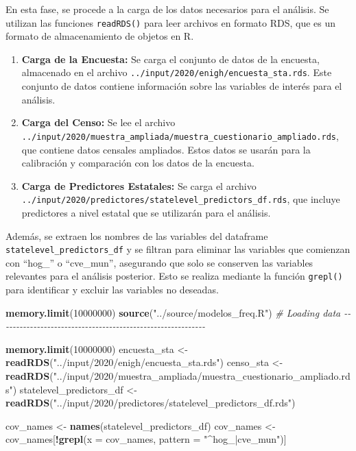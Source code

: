 \documentclass[
  12pt,
]{book}
\newenvironment{Shaded}{\begin{snugshade}}{\end{snugshade}}
\newcommand{\AttributeTok}[1]{\textcolor[rgb]{0.13,0.29,0.53}{#1}}
\newcommand{\CommentTok}[1]{\textcolor[rgb]{0.56,0.35,0.01}{\textit{#1}}}
\newcommand{\DecValTok}[1]{\textcolor[rgb]{0.00,0.00,0.81}{#1}}
\newcommand{\FunctionTok}[1]{\textcolor[rgb]{0.13,0.29,0.53}{\textbf{#1}}}
\newcommand{\NormalTok}[1]{#1}
\newcommand{\OtherTok}[1]{\textcolor[rgb]{0.56,0.35,0.01}{#1}}
\newcommand{\SpecialCharTok}[1]{\textcolor[rgb]{0.81,0.36,0.00}{\textbf{#1}}}
\newcommand{\StringTok}[1]{\textcolor[rgb]{0.31,0.60,0.02}{#1}}
\begin{document}
En esta fase, se procede a la carga de los datos necesarios para el análisis. Se utilizan las funciones \texttt{readRDS()} para leer archivos en formato RDS, que es un formato de almacenamiento de objetos en R.

\begin{enumerate}
\def\labelenumi{\arabic{enumi}.}
\item
  \textbf{Carga de la Encuesta:} Se carga el conjunto de datos de la encuesta, almacenado en el archivo \texttt{../input/2020/enigh/encuesta\_sta.rds}. Este conjunto de datos contiene información sobre las variables de interés para el análisis.
\item
  \textbf{Carga del Censo:} Se lee el archivo \texttt{../input/2020/muestra\_ampliada/muestra\_cuestionario\_ampliado.rds}, que contiene datos censales ampliados. Estos datos se usarán para la calibración y comparación con los datos de la encuesta.
\item
  \textbf{Carga de Predictores Estatales:} Se carga el archivo \texttt{../input/2020/predictores/statelevel\_predictors\_df.rds}, que incluye predictores a nivel estatal que se utilizarán para el análisis.
\end{enumerate}

Además, se extraen los nombres de las variables del dataframe \texttt{statelevel\_predictors\_df} y se filtran para eliminar las variables que comienzan con ``hog\_'' o ``cve\_mun'', asegurando que solo se conserven las variables relevantes para el análisis posterior. Esto se realiza mediante la función \texttt{grepl()} para identificar y excluir las variables no deseadas.

\begin{Shaded}
\begin{Highlighting}[]
\FunctionTok{memory.limit}\NormalTok{(}\DecValTok{10000000}\NormalTok{)}
\FunctionTok{source}\NormalTok{(}\StringTok{"../source/modelos\_freq.R"}\NormalTok{)}
\CommentTok{\# Loading data {-}{-}{-}{-}{-}{-}{-}{-}{-}{-}{-}{-}{-}{-}{-}{-}{-}{-}{-}{-}{-}{-}{-}{-}{-}{-}{-}{-}{-}{-}{-}{-}{-}{-}{-}{-}{-}{-}{-}{-}{-}{-}{-}{-}{-}{-}{-}{-}{-}{-}{-}{-}{-}{-}{-}{-}{-}{-}{-}{-}}

\FunctionTok{memory.limit}\NormalTok{(}\DecValTok{10000000}\NormalTok{)}
\NormalTok{encuesta\_sta }\OtherTok{\textless{}{-}} \FunctionTok{readRDS}\NormalTok{(}\StringTok{"../input/2020/enigh/encuesta\_sta.rds"}\NormalTok{)}
\NormalTok{censo\_sta }\OtherTok{\textless{}{-}} \FunctionTok{readRDS}\NormalTok{(}\StringTok{"../input/2020/muestra\_ampliada/muestra\_cuestionario\_ampliado.rds"}\NormalTok{)}
\NormalTok{statelevel\_predictors\_df }\OtherTok{\textless{}{-}} \FunctionTok{readRDS}\NormalTok{(}\StringTok{"../input/2020/predictores/statelevel\_predictors\_df.rds"}\NormalTok{)}

\NormalTok{cov\_names }\OtherTok{\textless{}{-}} \FunctionTok{names}\NormalTok{(statelevel\_predictors\_df)}
\NormalTok{cov\_names }\OtherTok{\textless{}{-}}\NormalTok{ cov\_names[}\SpecialCharTok{!}\FunctionTok{grepl}\NormalTok{(}\AttributeTok{x =}\NormalTok{ cov\_names, }\AttributeTok{pattern =} \StringTok{"\^{}hog\_|cve\_mun"}\NormalTok{)]}
\end{Highlighting}
\end{Shaded}
\end{document}
